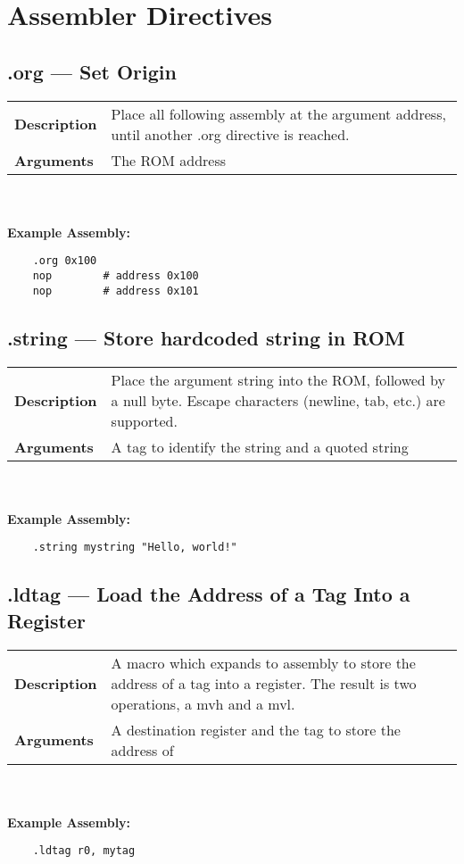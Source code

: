 \documentclass[titlepage]{article}
\begin{document}
\section{Assembler Directives}

\subsection{.org --- Set Origin}

\begin{tabular}{l p{8cm}}
{\bf Description} & Place all following assembly at the argument address, until another .org directive is reached. \\
{\bf Arguments} & The ROM address \\
\end{tabular}\\ \\
{\bf Example Assembly:}
\begin{verbatim}
    .org 0x100
    nop        # address 0x100
    nop        # address 0x101
\end{verbatim}

\subsection{.string --- Store hardcoded string in ROM}

\begin{tabular}{l p{8cm}}
{\bf Description} & Place the argument string into the ROM, followed by a null byte. Escape characters (newline, tab, etc.) are supported. \\
{\bf Arguments} & A tag to identify the string and a quoted string \\
\end{tabular}\\ \\
{\bf Example Assembly:}
\begin{verbatim}
    .string mystring "Hello, world!"
\end{verbatim}

\subsection{.ldtag --- Load the Address of a Tag Into a Register}

\begin{tabular}{l p{8cm}}
{\bf Description} & A macro which expands to assembly to store the address of a tag into a register. The result is two operations, a mvh and a mvl.  \\
{\bf Arguments} & A destination register and the tag to store the address of \\
\end{tabular}\\ \\
{\bf Example Assembly:}
\begin{verbatim}
    .ldtag r0, mytag
\end{verbatim}
\end{document}
